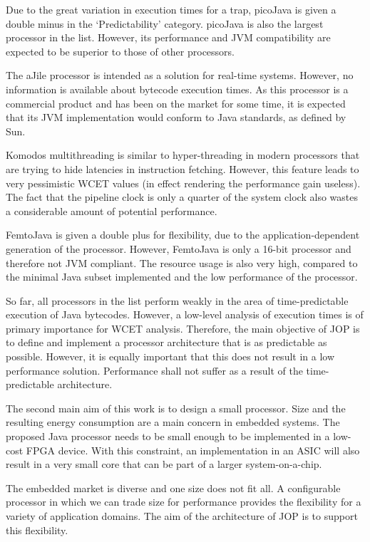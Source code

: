 Due to the great variation in execution times for a trap, picoJava
is given a double minus in the `Predictability' category. picoJava
is also the largest processor in the list. However, its performance
and JVM compatibility are expected to be superior to those of other
processors.

The aJile processor is intended as a solution for real-time systems.
However, no information is available about bytecode execution times.
As this processor is a commercial product and has been on the market
for some time, it is expected that its JVM implementation would
conform to Java standards, as defined by Sun.

Komodos multithreading is similar to hyper-threading in modern
processors that are trying to hide latencies in instruction
fetching. However, this feature leads to very pessimistic WCET
values (in effect rendering the performance gain useless). The fact
that the pipeline clock is only a quarter of the system clock also
wastes a considerable amount of potential performance.

FemtoJava is given a double plus for flexibility, due to the
application-dependent generation of the processor. However,
FemtoJava is only a 16-bit processor and therefore not JVM
compliant. The resource usage is also very high, compared to the
minimal Java subset implemented and the low performance of the
processor.

So far, all processors in the list perform weakly in the area of
time-predictable execution of Java bytecodes. However, a low-level
analysis of execution times is of primary importance for WCET
analysis. Therefore, the main objective of JOP is to define and
implement a processor architecture that is as predictable as
possible. However, it is equally important that this does not result
in a low performance solution. Performance shall not suffer as a
result of the time-predictable architecture.

The second main aim of this work is to design a small processor.
Size and the resulting energy consumption are a main concern in
embedded systems. The proposed Java processor needs to be small
enough to be implemented in a low-cost FPGA device. With this
constraint, an implementation in an ASIC will also result in a very
small core that can be part of a larger system-on-a-chip.

The embedded market is diverse and one size does not fit all. A
configurable processor in which we can trade size for performance
provides the flexibility for a variety of application domains. The
aim of the architecture of JOP is to support this flexibility.

